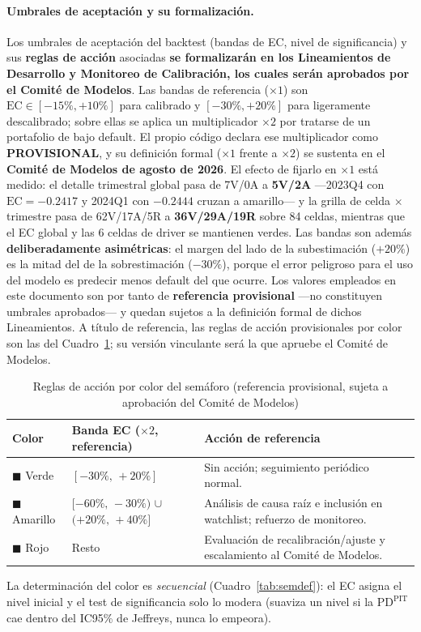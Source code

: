 \documentclass[12pt, a4paper]{article}
\newcommand{\PDPIT}{\ensuremath{\mathrm{PD}^{\mathrm{PIT}}}}
\newcommand{\EC}{\ensuremath{\mathrm{EC}}}
\begin{document}
\paragraph{Umbrales de aceptación y su formalización.} Los umbrales de aceptación del backtest
(bandas de EC, nivel de significancia) y sus \textbf{reglas de acción} asociadas \textbf{se
formalizarán en los Lineamientos de Desarrollo y Monitoreo de Calibración, los cuales serán
aprobados por el Comité de Modelos}. Las bandas de referencia ($\times1$) son
$\EC\in[-15\%,+10\%]$ para calibrado y $[-30\%,+20\%]$ para ligeramente descalibrado; sobre ellas
se aplica un multiplicador $\times2$ por tratarse de un portafolio de bajo default. El propio código
declara ese multiplicador como \textbf{PROVISIONAL}, y su definición formal ($\times1$ frente a $\times2$) se sustenta en el \textbf{Comité de Modelos de agosto de 2026}. El efecto de fijarlo en $\times1$ está medido:
el detalle trimestral global pasa de 7V/0A a \textbf{5V/2A} ---2023Q4 con $\EC=-0.2417$ y 2024Q1 con
$-0.2444$ cruzan a amarillo--- y la grilla de celda $\times$ trimestre pasa de 62V/17A/5R a \textbf{36V/29A/19R} sobre 84 celdas, mientras que el EC global y las 6 celdas de driver se mantienen verdes. Las bandas son
además \textbf{deliberadamente asimétricas}: el margen del lado de la subestimación ($+20\%$) es la
mitad del de la sobrestimación ($-30\%$), porque el error peligroso para el uso del modelo es
predecir menos default del que ocurre. Los valores empleados en este documento son por tanto de
\textbf{referencia provisional} ---no constituyen umbrales aprobados--- y quedan sujetos a la
definición formal de dichos Lineamientos. A título de referencia, las reglas de acción
provisionales por color son las del Cuadro~\ref{tab:accion}; su versión vinculante será la que
apruebe el Comité de Modelos.

\begin{table}[H]
\centering
\caption{Reglas de acción por color del semáforo (referencia provisional, sujeta a aprobación del Comité de Modelos)}
\label{tab:accion}
\small
\begin{tabular}{lp{3.2cm}p{8.0cm}}
\toprule
\textbf{Color} & \textbf{Banda EC ($\times2$, referencia)} & \textbf{Acción de referencia} \\
\midrule
\textcolor{semverde}{$\blacksquare$} Verde & $[-30\%,\,+20\%]$ & Sin acción; seguimiento periódico normal. \\
\textcolor{semamarillo}{$\blacksquare$} Amarillo & $[-60\%,\,-30\%)$ $\cup$ $(+20\%,\,+40\%]$ & Análisis de causa raíz e inclusión en watchlist; refuerzo de monitoreo. \\
\textcolor{semrojo}{$\blacksquare$} Rojo & Resto & Evaluación de recalibración/ajuste y escalamiento al Comité de Modelos. \\
\bottomrule
\end{tabular}
\end{table}
\noindent La determinación del color es \emph{secuencial} (Cuadro~\ref{tab:semdef}): el EC asigna
el nivel inicial y el test de significancia solo lo modera (suaviza un nivel si la \PDPIT{} cae
dentro del IC95\% de Jeffreys, nunca lo empeora).
\end{document}
